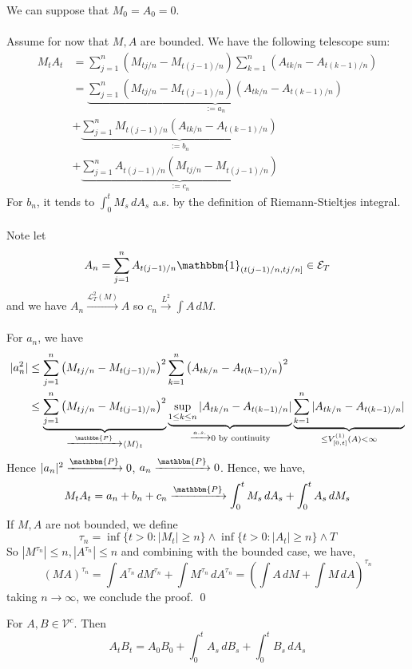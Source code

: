 \documentclass[12pt,a4paper]{article}
\renewenvironment{proof}
    {\begin{trivlist}\item[\hskip\labelsep\color{blue}\bfseries Proof:]}
    {\qed\end{trivlist}}
\begin{document}
\begin{proof}
    We can suppose that $M_0=A_0=0$.\\
    \\
    Assume for now that $M,A$ are bounded. We have the following telescope sum:
    \begin{align*}
        M_tA_t &= \sum_{j=1}^n \left(M_{tj/n}-M_{t(j-1)/n}\right)\sum_{k=1}^n\left(A_{tk/n}- A_{t(k-1)/n}\right)\\
        &= \underbrace{\sum_{j=1}^n \left(M_{tj/n}-M_{t(j-1)/n}\right)\left(A_{tk/n}- A_{t(k-1)/n}\right)}_{:= a_n}\\
        &+ \underbrace{\sum_{j=1}^n M_{t(j-1)/n}\left(A_{tk/n}- A_{t(k-1)/n}\right)}_{:=b_n}\\
        &+\underbrace{\sum_{j=1}^n A_{t(j-1)/n}\left(M_{tj/n}-M_{t(j-1)/n}\right)}_{:=c_n}
    \end{align*}
    For $b_n$, it tends to $\int_0^t M_s\, dA_s$ a.s. by the definition of Riemann-Stieltjes integral.\\
    \\
    Note let 
    $$
    A_n = \sum_{j=1}^n A_{t(j-1)/n}\mathbbm{1}_{(t(j-1)/n, tj/n]} \in \mathcal{E}_T
    $$
    and we have $A_n\xrightarrow{\mathcal{L}^2_{T}(M)}A$ so $c_n\xrightarrow{L^2} \int A\,dM$.\\
    \\
    For $a_n$, we have
    \begin{align*}
        |a_n^2| &\le \sum_{j=1}^n \left(M_{tj/n}-M_{t(j-1)/n}\right)^2\sum_{k=1}^n \left(A_{tk/n}- A_{t(k-1)/n}\right)^2\\
        &\le \underbrace{\sum_{j=1}^n \left(M_{tj/n}-M_{t(j-1)/n}\right)^2}_{\xrightarrow{\mathbbm{P}}\langle M\rangle_t}\underbrace{\sup_{1\le k\le n}|A_{tk/n}- A_{t(k-1)/n}|}_{\xrightarrow{a.s.} 0 \text{ by continuity}}\underbrace{\sum_{k=1}^n |A_{tk/n}- A_{t(k-1)/n}|}_{\le V^{(1)}_{[0,t]}(A)<\infty}
    \end{align*}
    Hence $|a_n|^2\xrightarrow{\mathbbm{P}} 0$, $a_n\xrightarrow{\mathbbm{P}}0$. Hence, we have,
    $$
    M_tA_t = a_n + b_n + c_n \xrightarrow{\mathbbm{P}} \int_0^t M_s\, dA_s + \int_0^t A_s\,dM_s
    $$
    If $M,A$ are not bounded, we define
    $$
    \tau_n = \inf\{t>0: |M_t|\ge n\}\wedge \inf\{t>0: |A_t|\ge n\}\wedge T
    $$
    So $|M^{\tau_n}|\le n, |A^{\tau_n}|\le n$ and combining with the bounded case, we have,
    $$
    (MA)^{\tau_n} = \int A^{\tau_n} \,dM^{\tau_n} + \int M^{\tau_n}\, dA^{\tau_n} = \left(\int A\, dM + \int M\, dA\right)^{\tau_n}
    $$
    taking $n\to\infty$, we conclude the proof.
\end{proof}
\begin{proposition}{}{}
    For $A,B\in \mathcal{V}^c$. Then
    $$
    A_tB_t = A_0B_0 +\int_0^t A_s\, dB_s + \int_0^t B_s\, dA_s
    $$
\end{proposition}
\pagebreak
\end{document}
